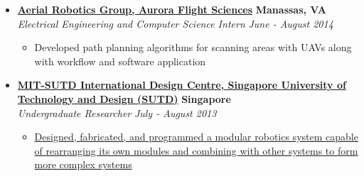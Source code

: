 \documentclass[10pt,letterpaper]{article}
\begin{document}
\begin{itemize}
\begin{itemize}[label=\textbullet]
\end{itemize}

%	
%	

    \item[]
    {\href{http://aurora.aero}{\textbf{Aerial Robotics Group, Aurora Flight Sciences}} \hfill
      \textbf{Manassas, VA}}
    \\
    {\emph{Electrical Engineering and Computer Science Intern} \hfill \emph{June - August 2014}}
	
	\begin{itemize}[label=\textbullet]
	\itemsep0em
	\item Developed path planning algorithms for scanning areas with UAVs along with workflow and software application

\end{itemize}

    \item[]
    {\href{http://www.sutd.edu.sg/idc.aspx}{\textbf{MIT-SUTD International Design Centre, Singapore University of Technology and Design (SUTD)}} \hfill
      \textbf{Singapore}}
    \\
    {\emph{Undergraduate Researcher} \hfill \emph{July - August 2013}}
	
	\begin{itemize}[label=\textbullet]
	\itemsep0em
	\item {\href{http://vincentkee.wordpress.com/tetromino/}{Designed, fabricated, and programmed a modular robotics system capable of rearranging its own modules and combining with other systems to form more complex systems}}


\end{itemize}
\end{itemize}
\end{document}
